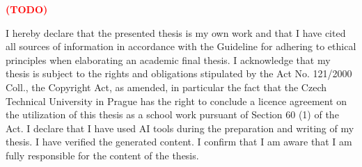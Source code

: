 \documentclass[english,master,oneside]{ctufit-thesis}
\newcommand{\todoadd}[0]{\textbf{\textcolor{red}{(TODO)}}}
\begin{document}
\frontmatter\frontmatterinit %

\thispagestyle{empty}\maketitle\thispagestyle{empty}\cleardoublepage %



\imprintpage %
\stopTOCentries

\begin{acknowledgmentpage}
	\todoadd
\end{acknowledgmentpage}


\begin{declarationpage}
I hereby declare that the presented thesis is my own work and that I have cited all sources of
information in accordance with the Guideline for adhering to ethical principles when elaborating an
academic final thesis.
I acknowledge that my thesis is subject to the rights and obligations stipulated by the Act No.
121/2000 Coll., the Copyright Act, as amended, in particular the fact that the Czech Technical
University in Prague has the right to conclude a licence agreement on the utilization of this thesis as
a school work pursuant of Section 60 (1) of the Act.
I declare that I have used AI tools during the preparation and writing of my thesis. I have verified
the generated content. I confirm that I am aware that I am fully responsible for the content of the
thesis.
\end{declarationpage}

\printabstractpage

\tableofcontents

\listoffigures
\begingroup
\let\clearpage\relax
\listoftables
\thectufitlistingscommand
\endgroup

\chapter{\thectufitabbreviationlabel}
\end{document}
